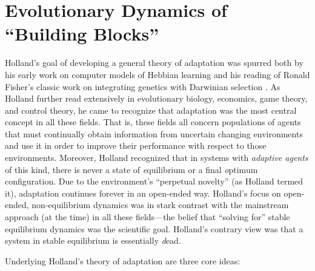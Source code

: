\documentclass{sig-alternate}
\begin{document}
\section{Evolutionary Dynamics of ``Building Blocks''}  

Holland's goal of developing a general theory of adaptation was
spurred both by his early work on computer models of Hebbian learning
\cite{Rochester1956} and his reading of Ronald Fisher's classic work
on integrating genetics with Darwinian selection \cite{Fisher1930}.
As Holland further read extensively in evolutionary biology,
economics, game theory, and control theory, he came to recognize that
adaptation was the most central concept in all these fields.  That is,
these fields all concern populations of agents that must continually
obtain information from uncertain changing environments and use it in
order to improve their performance with respect to those environments.
Moreover, Holland recognized that in systems with {\em adaptive
  agents} of this kind, there is never a state of {\emph equilibrium}
or a final {\emph optimum} configuration.  Due to the environment's
``perpetual novelty'' (as Holland termed it), adaptation continues
forever in an open-ended way.  Holland's focus on open-ended,
non-equilibrium dynamics was in stark contrast with the mainstream
approach (at the time) in all these fields---the belief that ``solving
for'' stable equilibrium dynamics was the scientific goal.  Holland's
contrary view was that a system in stable equilibrium is essentially
{\emph dead}.

Underlying Holland's theory of adaptation are three core ideas: 
\end{document}
